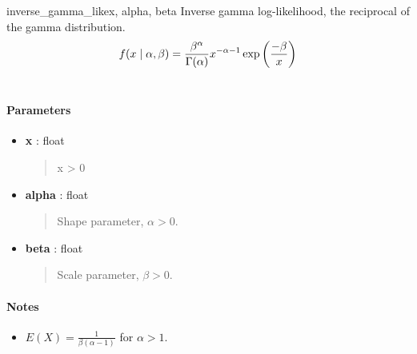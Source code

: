 \hypertarget{pymc.distributions.inverse_gamma_like}{}\begin{funcdesc}{inverse\_gamma\_like}{x, alpha, beta}
Inverse gamma log-likelihood, the reciprocal of the gamma distribution.
\begin{gather}
\begin{split}f(x \mid \alpha, \beta) = \frac{\beta^{\alpha}}{\Gamma(\alpha)} x^{-\alpha - 1} \exp\left(\frac{-\beta}{x}\right)\end{split}\notag\\\begin{split}\end{split}\notag
\end{gather}
\paragraph{Parameters}
\begin{itemize}
\item[] \textbf{x} : float
\begin{quote}

x \textgreater{} 0
\end{quote}

\item[] \textbf{alpha} : float
\begin{quote}

Shape parameter, $\alpha > 0$.
\end{quote}

\item[] \textbf{beta} : float
\begin{quote}

Scale parameter, $\beta > 0$.
\end{quote}
\end{itemize}
\paragraph{Notes}
\begin{itemize}
\item $E(X)=\frac{1}{\beta(\alpha-1)}$  for $\alpha > 1$.
\end{itemize}
\end{funcdesc}

